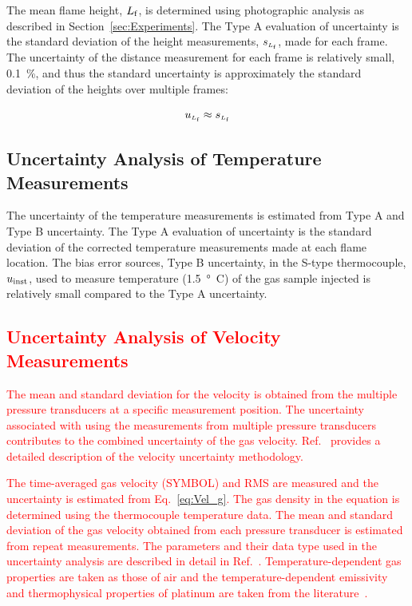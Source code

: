 \documentclass[12pt]{article}
\begin{document}
The mean flame height, ${L_{\rm{f}}}$, is determined using photographic analysis as described in Section~\ref{sec:Experiments}. The Type A evaluation of uncertainty is the standard deviation of the height measurements, $s_{\scriptscriptstyle L_{\rm{f}}}$, made for each frame. The uncertainty of the distance measurement for each frame is relatively small, 0.1~\%, and thus the standard uncertainty is approximately the standard deviation of the heights over multiple frames:

\begin{equation}
\label{eq:mean_flame_height}
u_{\scriptscriptstyle L_{\rm{f}}} \approx s_{\scriptscriptstyle{L_{\rm f}}}
\end{equation}


\subsection{Uncertainty Analysis of Temperature Measurements}
\label{sec:Uncertainty_Temperature_Measurements}
The uncertainty of the temperature measurements is estimated from Type A and Type B uncertainty. The Type A evaluation of uncertainty is the standard deviation of the corrected temperature measurements made at each flame location. The bias error sources, Type B uncertainty, in the S-type thermocouple, $u_{\rm inst}$, used to measure temperature (\SI{1.5}{\degree C}) of the gas sample injected is relatively small compared to the Type A uncertainty.

\textcolor{red}{\subsection{Uncertainty Analysis of Velocity Measurements}}
\textcolor{red}{The mean and standard deviation for the velocity is obtained from the multiple pressure transducers at a specific measurement position. The uncertainty associated with using the measurements from multiple pressure transducers contributes to the combined uncertainty of the gas velocity. Ref.~\cite{Sung2021} provides a detailed description of the velocity uncertainty methodology.}

\textcolor{red}{The time-averaged gas velocity (SYMBOL) and RMS are measured and the uncertainty is estimated from Eq.~\ref{eq:Vel_g}. The gas density in the equation is determined using the thermocouple temperature data.  The mean and standard deviation of the gas velocity obtained from each pressure transducer is estimated from repeat measurements.  The parameters and their data type used in the uncertainty analysis are described in detail in Ref.~\cite{Sung2021}. Temperature-dependent gas properties are taken as those of air and the temperature-dependent emissivity and thermophysical properties of platinum are taken from the literature~\cite{Sung2021}.}
\end{document}

